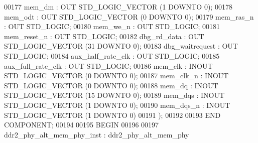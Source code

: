 \begin{DoxyCode}
{00177         mem\_dm  : \textcolor{keywordflow}{OUT} \textcolor{comment}{STD\_LOGIC\_VECTOR} (\textcolor{vhdllogic}{}\textcolor{vhdllogic}{1} \textcolor{keywordflow}{DOWNTO} \textcolor{vhdllogic}{}\textcolor{vhdllogic}{0});
00178         mem\_odt : \textcolor{keywordflow}{OUT} \textcolor{comment}{STD\_LOGIC\_VECTOR} (\textcolor{vhdllogic}{}\textcolor{vhdllogic}{0} \textcolor{keywordflow}{DOWNTO} \textcolor{vhdllogic}{}\textcolor{vhdllogic}{0});
00179         mem\_ras\_n   : \textcolor{keywordflow}{OUT} \textcolor{comment}{STD\_LOGIC};
00180         mem\_we\_n    : \textcolor{keywordflow}{OUT} \textcolor{comment}{STD\_LOGIC};
00181         mem\_reset\_n : \textcolor{keywordflow}{OUT} \textcolor{comment}{STD\_LOGIC};
00182         dbg\_rd\_data : \textcolor{keywordflow}{OUT} \textcolor{comment}{STD\_LOGIC\_VECTOR} (\textcolor{vhdllogic}{}\textcolor{vhdllogic}{31} \textcolor{keywordflow}{DOWNTO} \textcolor{vhdllogic}{}\textcolor{vhdllogic}{0});
00183         dbg\_waitrequest : \textcolor{keywordflow}{OUT} \textcolor{comment}{STD\_LOGIC};
00184         aux\_half\_rate\_clk   : \textcolor{keywordflow}{OUT} \textcolor{comment}{STD\_LOGIC};
00185         aux\_full\_rate\_clk   : \textcolor{keywordflow}{OUT} \textcolor{comment}{STD\_LOGIC};
00186         mem\_clk : \textcolor{keywordflow}{INOUT} \textcolor{comment}{STD\_LOGIC\_VECTOR} (\textcolor{vhdllogic}{}\textcolor{vhdllogic}{0} \textcolor{keywordflow}{DOWNTO} \textcolor{vhdllogic}{}\textcolor{vhdllogic}{0});
00187         mem\_clk\_n   : \textcolor{keywordflow}{INOUT} \textcolor{comment}{STD\_LOGIC\_VECTOR} (\textcolor{vhdllogic}{}\textcolor{vhdllogic}{0} \textcolor{keywordflow}{DOWNTO} \textcolor{vhdllogic}{}\textcolor{vhdllogic}{0});
00188         mem\_dq  : \textcolor{keywordflow}{INOUT} \textcolor{comment}{STD\_LOGIC\_VECTOR} (\textcolor{vhdllogic}{}\textcolor{vhdllogic}{15} \textcolor{keywordflow}{DOWNTO} \textcolor{vhdllogic}{}\textcolor{vhdllogic}{0});
00189         mem\_dqs : \textcolor{keywordflow}{INOUT} \textcolor{comment}{STD\_LOGIC\_VECTOR} (\textcolor{vhdllogic}{}\textcolor{vhdllogic}{1} \textcolor{keywordflow}{DOWNTO} \textcolor{vhdllogic}{}\textcolor{vhdllogic}{0});
00190         mem\_dqs\_n   : \textcolor{keywordflow}{INOUT} \textcolor{comment}{STD\_LOGIC\_VECTOR} (\textcolor{vhdllogic}{}\textcolor{vhdllogic}{1} \textcolor{keywordflow}{DOWNTO} \textcolor{vhdllogic}{}\textcolor{vhdllogic}{0})
00191     );
00192 
00193     \textcolor{keywordflow}{END} \textcolor{keywordflow}{COMPONENT};
00194 
00195 \textcolor{vhdlkeyword}{BEGIN}
00196 
00197     ddr2_phy_alt_mem_phy_inst : ddr2\_phy\_alt\_mem\_phy
}
\end{DoxyCode}
